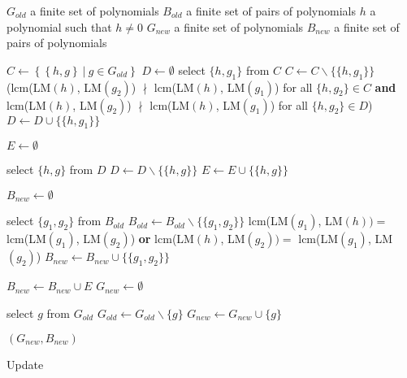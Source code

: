 \begin{algorithm}[htp]
  \begin{algorithmic}[1]
    \Require
      \Statex $G_{old}$ a finite set of polynomials
      \Statex $B_{old}$ a finite set of pairs of polynomials
      \Statex $h$ a polynomial such that $h \neq 0$
    \Ensure
      \Statex $G_{new}$ a finite set of polynomials
      \Statex $B_{new}$ a finite set of pairs of polynomials
      \Statex

    \State $C \gets \left\{\left\{h, g\right\}\ |\ g\in G_{old}\right\}$
    \State $D \gets \emptyset$
     \label{alg:update:w1b}
      \State select $\{h,g_1\}$ from $C$
      \State $C \gets C\backslash \{\{h, g_1\}\}$
        \StatexIndent[3](lcm(LM$(h)$, LM$(g_2)$) $\nmid$ lcm(LM$(h)$, LM$(g_1)$) for all $\{h, g_2\}\in C$ \textbf{and}
        \StatexIndent[3]lcm(LM$(h)$, LM$(g_2)$) $\nmid$ lcm(LM$(h)$, LM$(g_1)$) for all $\{h, g_2\} \in D$) \algorithmicthen
        \State $D \gets D \cup \{\{h, g_1\}\}$
      \EndIf
    \EndWhile \label{alg:update:w1e}

    \State $E \gets \emptyset$

     \label{alg:update:w2b}
      \State select $\{h, g\}$ from $D$
      \State $D \gets D\backslash \{\{h, g\}\}$
        \State $E \gets E \cup \{\{h, g\}\}$
      \EndIf
    \EndWhile \label{alg:update:w2e}

    \State $B_{new} \gets \emptyset$

     \label{alg:update:w3b}
      \State select $\{g_1, g_2\}$ from $B_{old}$
      \State $B_{old} \gets B_{old} \backslash \{\{g_1, g_2\}\}$
        \StatexIndent[3]lcm(LM$(g_1)$, LM$(h)) = $ lcm(LM$(g_1)$, LM$(g_2)$) \textbf{or}
        \StatexIndent[3]lcm(LM$(h)$, LM$(g_2)) = $ lcm(LM$(g_1)$, LM$(g_2)$) \algorithmicthen
        \State $B_{new} \gets B_{new} \cup \{\{g_1, g_2\}\}$
      \EndIf
    \EndWhile \label{alg:update:w3e}

    \State $B_{new} \gets B_{new} \cup E$
    \State $G_{new} \gets \emptyset$
    
      \State select $g$ from $G_{old}$
      \State $G_{old} \gets G_{old} \backslash \{g\}$
        \State $G_{new} \gets G_{new} \cup \{g\}$
      \EndIf
    \EndWhile

    \State \Return $(G_{new}, B_{new})$

  \end{algorithmic}
  \caption{Update}
  \label{alg:update}
\end{algorithm}
